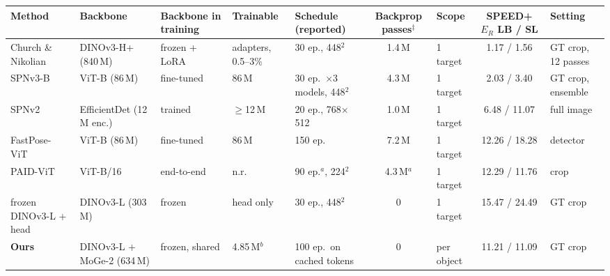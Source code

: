 \begin{tabular}{@{}l l l l l c l c l@{}}
\toprule
Method & Backbone & Backbone in training & Trainable & Schedule (reported) & Backprop passes$^\ddagger$ & Scope & SPEED+ $E_R$ LB / SL & Setting \\
\midrule
Church \& Nikolian~\cite{church2026vfm} & DINOv3-H+ (840\,M) & frozen + LoRA & adapters, 0.5--3\% & 30 ep., 448$^2$ & 1.4\,M & 1 target & 1.17 / 1.56 & GT crop, 12 passes \\
SPNv3-B~\cite{park2026spnv3} & ViT-B (86\,M) & fine-tuned & 86\,M & 30 ep.\ $\times$3 models, 448$^2$ & 4.3\,M & 1 target & 2.03 / 3.40 & GT crop, ensemble \\
SPNv2~\cite{park2024spnv2} & EfficientDet (12\,M enc.) & trained & $\ge$12\,M & 20 ep., 768$\times$512 & 1.0\,M & 1 target & 6.48 / 11.07 & full image \\
FastPose-ViT~\cite{ancey2026fastpose} & ViT-B (86\,M) & fine-tuned & 86\,M & 150 ep. & 7.2\,M & 1 target & 12.26 / 18.28 & detector \\
PAID-ViT~\cite{xie2026paidvit} & ViT-B/16 & end-to-end & n.r. & 90 ep.$^a$, 224$^2$ & 4.3\,M$^a$ & 1 target & 12.29 / 11.76 & crop \\
frozen DINOv3-L + head~\cite{church2026vfm} & DINOv3-L (303\,M) & frozen & head only & 30 ep., 448$^2$ & 0 & 1 target & 15.47 / 24.49 & GT crop \\
\midrule
\textbf{Ours} & DINOv3-L + MoGe-2 (634\,M) & frozen, shared & 4.85\,M$^b$ & 100 ep.\ on cached tokens & 0 & per object & 11.21 / 11.09 & GT crop \\
\bottomrule
\end{tabular}